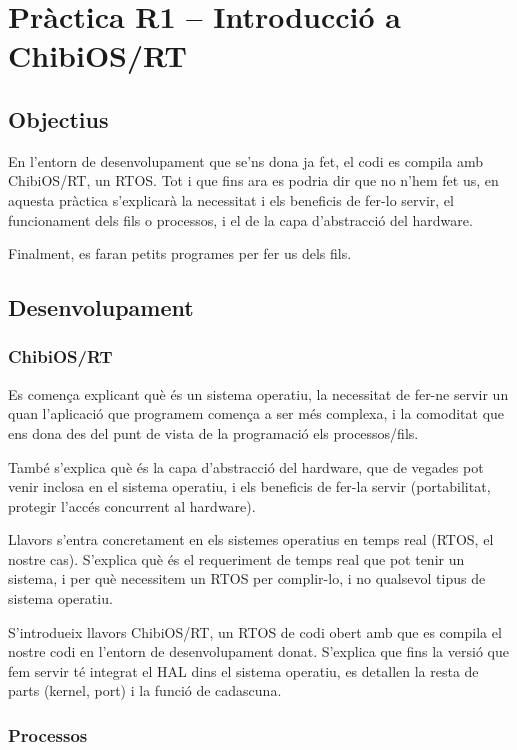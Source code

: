 \chapter{\label{ch:r1} Pràctica R1 -- Introducció a ChibiOS/RT}

\section{Objectius}

En l'entorn de desenvolupament que se'ns dona ja fet, el codi es compila amb
ChibiOS/RT, un RTOS. Tot i que fins ara es podria dir que no n'hem
fet us, en aquesta pràctica s'explicarà la necessitat i els beneficis de fer-lo
servir, el funcionament dels fils o processos, i el de la capa d'abstracció del
hardware.

Finalment, es faran petits programes per fer us dels fils.

\section{Desenvolupament}


\subsection{ChibiOS/RT}

Es comença explicant què és un sistema operatiu, la necessitat de fer-ne servir un quan
l'aplicació que programem comença a ser més complexa, i la comoditat que ens dona des del
punt de vista de la programació els processos/fils.

També s'explica què és la capa d'abstracció del hardware, que de vegades pot venir inclosa
en el sistema operatiu, i els beneficis de fer-la servir (portabilitat, protegir l'accés
concurrent al hardware).

Llavors s'entra concretament en els sistemes operatius en temps real (RTOS, el nostre cas).
S'explica què és el requeriment de temps real que pot tenir un sistema, i per què necessitem
un RTOS per complir-lo, i no qualsevol tipus de sistema operatiu.

S'introdueix llavors ChibiOS/RT, un RTOS de codi obert amb que es compila el nostre codi en
l'entorn de desenvolupament donat. S'explica que fins la versió que fem servir té integrat
el HAL dins el sistema operatiu, es detallen la resta de parts (kernel, port) i la funció
de cadascuna.

\subsection{Processos}

